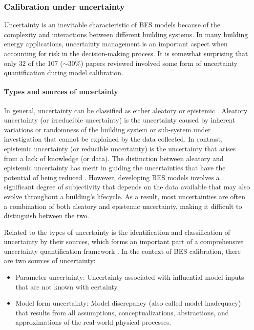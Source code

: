 \documentclass[review]{elsarticle}
\begin{document}
\subsubsection{Calibration under uncertainty}

Uncertainty is an inevitable characteristic of BES models because of the complexity and interactions between different building systems. In many building energy applications, uncertainty management is an important aspect when accounting for risk in the decision-making process. It is somewhat surprising that only 32 of the 107 ($\sim$30\%) papers reviewed involved some form of uncertainty quantification during model calibration. 

\paragraph{Types and sources of uncertainty}

In general, uncertainty can be classified as either aleatory or epistemic \cite{tian2018review, roy2011comprehensive}. Aleatory uncertainty (or irreducible uncertainty) is the uncertainty caused by inherent variations or randomness of the building system or sub-system under investigation that cannot be explained by the data collected. In contrast, epistemic uncertainty (or reducible uncertainty) is the uncertainty that arises from a lack of knowledge (or data). The distinction between aleatory and epistemic uncertainty has merit in guiding the uncertainties that have the potential of being reduced \cite{der2009aleatory}. However, developing BES models involves a significant degree of subjectivity that depends on the data available that may also evolve throughout a building's lifecycle. As a result, most uncertainties are often a combination of both aleatory and epistemic uncertainty, making it difficult to distinguish between the two. 

Related to the types of uncertainty is the identification and classification of uncertainty by their sources, which forms an important part of a comprehensive uncertainty quantification framework \cite{roy2011comprehensive, sun2014closing}. In the context of BES calibration, there are two sources of uncertainty:
\begin{itemize}
    \item Parameter uncertainty: Uncertainty associated with influential model inputs that are not known with certainty. 
    \item Model form uncertainty: Model discrepancy (also called model inadequacy) that results from all assumptions, conceptualizations, abstractions, and approximations of the real-world physical processes. 
\end{itemize}
\end{document}
